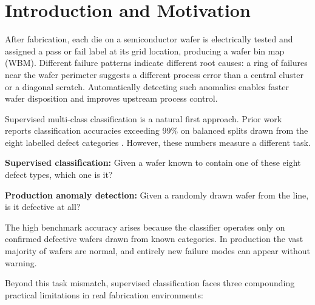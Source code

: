 \documentclass[11pt]{article}
\begin{document}
\newpage
\tableofcontents
\newpage


\section{Introduction and Motivation}
\label{sec:problem}

After fabrication, each die on a semiconductor wafer is electrically tested and
assigned a pass or fail label at its grid location, producing a wafer bin
map (WBM). Different failure patterns indicate different root causes: a ring of
failures near the wafer perimeter suggests a different process error than a central
cluster or a diagonal scratch. Automatically detecting such anomalies enables
faster wafer disposition and improves upstream process control.

Supervised multi-class classification is a natural first approach. Prior work
reports classification accuracies exceeding 99\% on balanced splits drawn from
the eight labelled defect categories \cite{khatun2026cbam, taha2025survey}.
However, these numbers measure a different task.

\begin{tcolorbox}[colback=blue!7!white, colframe=blue!45!white, boxsep=3pt, left=4pt, right=4pt, top=3pt, bottom=3pt]
\textbf{Supervised classification:} Given a wafer known to contain one of these eight defect types, which one is it?
\end{tcolorbox}

\begin{tcolorbox}[colback=orange!10!white, colframe=orange!55!white, boxsep=3pt, left=4pt, right=4pt, top=3pt, bottom=3pt]
\textbf{Production anomaly detection:} Given a randomly drawn wafer from the line, is it defective at all?
\end{tcolorbox}

The high benchmark accuracy arises because the
classifier operates only on confirmed defective wafers drawn from known categories.
In production the vast majority of wafers are normal, and entirely new failure
modes can appear without warning.

Beyond this task mismatch, supervised classification faces three compounding
practical limitations in real fabrication environments:
\end{document}

